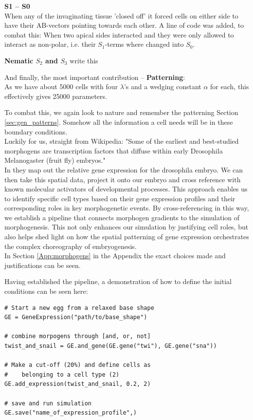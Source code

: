 \textbf{S1 -- S0}\\
When any of the invaginating tissue 'closed off' it forced cells on either side to have their AB-vectors pointing towards each other. A line of code was added, to combat this: When two apical sides interacted and  they were only allowed to interact as non-polar, i.e. their $S_1$-terms where changed into $S_0$.


\textbf{Nematic $S_2$ and $S_3$} write this

And finally, the most important contribution -- \textbf{Patterning}:\\
As we have about 5000 cells with four $\lambda$'s and a wedging constant $\alpha$ for each, this effectively gives 25000 parameters.

To combat this, we again look to nature and remember the patterning Section \ref{sec:gen_patterns}. Somehow all the information a cell needs will be in these boundary conditions.\\
Luckily for us, straight from Wikipedia:
"Some of the earliest and best-studied morphogens are transcription factors that diffuse within early Drosophila Melanogaster (fruit fly) embryos."\\


In  they map out the relative gene expression for the drosophila embryo. We can then take this spatial data, project it onto our embryo and cross reference with known molecular activators of developmental processes.  This approach enables us to identify specific cell types based on their gene expression profiles and their corresponding roles in key morphogenetic events. By cross-referencing in this way, we establish a pipeline that connects morphogen gradients to the simulation of morphogenesis. This not only enhances our simulation by justifying cell roles, but also helps shed light on how the spatial patterning of gene expression orchestrates the complex choreography of embryogenesis.\\

In Section \ref{App:morphogens} in the Appendix the exact choices made and justifications can be seen.

Having established the pipeline, a demonstration of how to define the initial conditions can be seen here:

\begin{lstlisting}
# Start a new egg from a relaxed base shape
GE = GeneExpression("path/to/base_shape")

# combine morpogens through [and, or, not]
twist_and_snail = GE.and_gene(GE.gene("twi"), GE.gene("sna"))

# Make a cut-off (20%) and define cells as 
#    belonging to a cell type (2) 
GE.add_expression(twist_and_snail, 0.2, 2) 

# save and run simulation
GE.save("name_of_expression_profile",)

\end{lstlisting}


